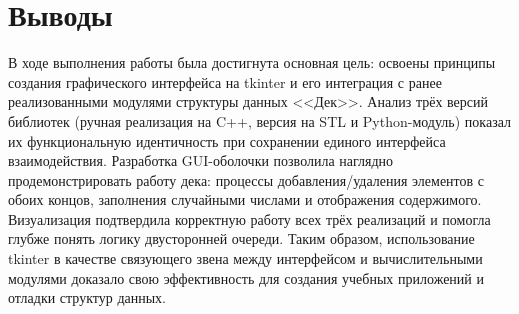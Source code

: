 \documentclass[oneside,a4paper,14pt]{extarticle} %
\begin{document}
	\section*{Выводы} В ходе выполнения работы была достигнута основная цель: освоены принципы создания графического интерфейса на tkinter и его интеграция с ранее реализованными модулями структуры данных <<Дек>>. Анализ трёх версий библиотек (ручная реализация на C++, версия на STL и Python-модуль) показал их функциональную идентичность при сохранении единого интерфейса взаимодействия. Разработка GUI-оболочки позволила наглядно продемонстрировать работу дека: процессы добавления/удаления элементов с обоих концов, заполнения случайными числами и отображения содержимого. Визуализация подтвердила корректную работу всех трёх реализаций и помогла глубже понять логику двусторонней очереди. Таким образом, использование tkinter в качестве связующего звена между интерфейсом и вычислительными модулями доказало свою эффективность для создания учебных приложений и отладки структур данных.
\end{document}
